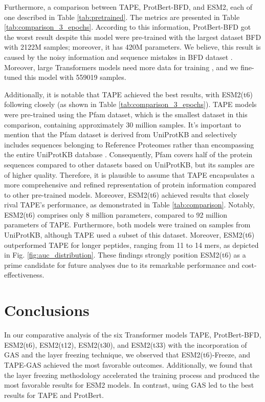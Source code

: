 Furthermore, a comparison between TAPE, ProtBert-BFD, and ESM2, each of one described in Table \ref{tab:pretrained}. The metrics are presented in Table \ref{tab:comparison_3_epochs}. According to this information, ProtBert-BFD got the worst result despite this model were pre-trained with the largest dataset BFD with 2122M samples; moreover, it has 420M parameters. We believe, this result is caused by the noisy information and sequence mistakes in BFD dataset \cite{elnaggar2021prottrans}. Moreover, large Transformers models need more data for training \cite{elnaggar2021prottrans}, and we fine-tuned this model with 559019 samples.

Additionally, it is notable that TAPE achieved the best results, with ESM2(t6) following closely (as shown in Table \ref{tab:comparison_3_epochs}). TAPE models were pre-trained using the Pfam dataset, which is the smallest dataset in this comparison, containing approximately 30 million samples. It's important to mention that the Pfam dataset is derived from UniProtKB and selectively includes sequences belonging to Reference Proteomes rather than encompassing the entire UniProtKB database \cite{finn2016pfam}. Consequently, Pfam covers half of the protein sequences compared to other datasets based on UniProtKB, but its samples are of higher quality. Therefore, it is plausible to assume that TAPE encapsulates a more comprehensive and refined representation of protein information compared to other pre-trained models. Moreover, ESM2(t6) achieved results that closely rival TAPE's performance, as demonstrated in Table \ref{tab:comparison}. Notably, ESM2(t6) comprises only 8 million parameters, compared to 92 million parameters of TAPE. Furthermore, both models were trained on samples from UniProtKB, although TAPE used a subset of this dataset. Moreover, ESM2(t6) outperformed TAPE for longer peptides, ranging from 11 to 14 mers, as depicted in Fig. \ref{fig:auc_distribution}. These findings strongly position ESM2(t6) as a prime candidate for future analyses due to its remarkable performance and cost-effectiveness.


\section{Conclusions}

In our comparative analysis of the six Transformer models TAPE, ProtBert-BFD, ESM2(t6), ESM2(t12), ESM2(t30), and ESM2(t33) with the incorporation of GAS and the layer freezing technique, we observed that ESM2(t6)-Freeze, and TAPE-GAS achieved the most favorable outcomes. Additionally, we found that the layer freezing methodology accelerated the training process and produced the most favorable results for ESM2 models. In contrast, using GAS led to the best results for TAPE and ProtBert.

